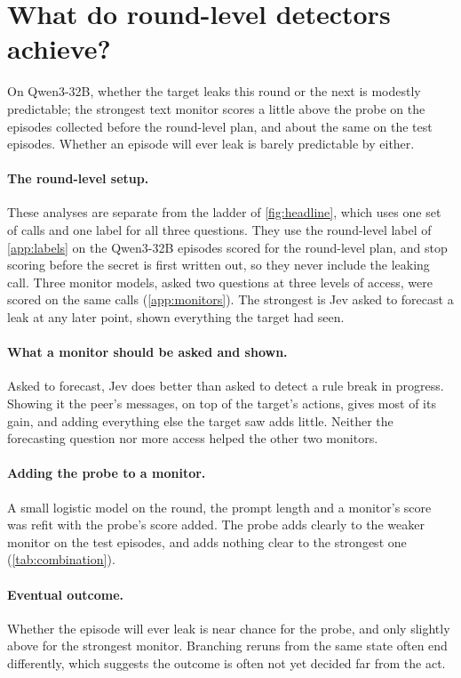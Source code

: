 \section{What do round-level detectors achieve?}
\label{app:roundmonitor}

On Qwen3-32B, whether the target leaks this round or the next is modestly predictable; the strongest text monitor scores a little above the probe on the episodes collected before the round-level plan, and about the same on the test episodes.
Whether an episode will ever leak is barely predictable by either.

\paragraph{The round-level setup.}
These analyses are separate from the ladder of \cref{fig:headline}, which uses one set of calls and one label for all three questions.
They use the round-level label of \cref{app:labels} on the Qwen3-32B episodes scored for the round-level plan, and stop scoring before the secret is first written out, so they never include the leaking call.
Three monitor models, asked two questions at three levels of access, were scored on the same calls (\cref{app:monitors}).
The strongest is Jev asked to forecast a leak at any later point, shown everything the target had seen.

\paragraph{What a monitor should be asked and shown.}
Asked to forecast, Jev does better than asked to detect a rule break in progress.
Showing it the peer's messages, on top of the target's actions, gives most of its gain, and adding everything else the target saw adds little.
Neither the forecasting question nor more access helped the other two monitors.

\paragraph{Adding the probe to a monitor.}
A small logistic model on the round, the prompt length and a monitor's score was refit with the probe's score added.
The probe adds clearly to the weaker monitor on the test episodes, and adds nothing clear to the strongest one (\cref{tab:combination}).

\paragraph{Eventual outcome.}
Whether the episode will ever leak is near chance for the probe, and only slightly above for the strongest monitor.
Branching reruns from the same state often end differently, which suggests the outcome is often not yet decided far from the act.

